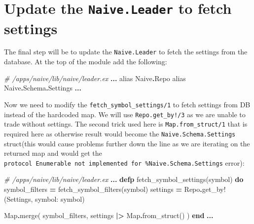 \documentclass[
  oneside]{book}
\newenvironment{Shaded}{\begin{snugshade}}{\end{snugshade}}
\newcommand{\CommentTok}[1]{\textcolor[rgb]{0.56,0.35,0.01}{\textit{#1}}}
\newcommand{\ConstantTok}[1]{\textcolor[rgb]{0.00,0.00,0.00}{#1}}
\newcommand{\ImportTok}[1]{#1}
\newcommand{\KeywordTok}[1]{\textcolor[rgb]{0.13,0.29,0.53}{\textbf{#1}}}
\newcommand{\NormalTok}[1]{#1}
\newcommand{\OperatorTok}[1]{\textcolor[rgb]{0.81,0.36,0.00}{\textbf{#1}}}
\newcommand{\VariableTok}[1]{\textcolor[rgb]{0.00,0.00,0.00}{#1}}
\begin{document}
\hypertarget{update-the-naive.leader-to-fetch-settings}{%
\section{\texorpdfstring{Update the \texttt{Naive.Leader} to fetch settings}{Update the Naive.Leader to fetch settings}}\label{update-the-naive.leader-to-fetch-settings}}

The final step will be to update the \texttt{Naive.Leader} to fetch the settings from the database. At the top of the module add the following:

\begin{Shaded}
\begin{Highlighting}[]
\CommentTok{\# /apps/naive/lib/naive/leader.ex}
  \OperatorTok{...}
  \ImportTok{alias} \ConstantTok{Naive}\OperatorTok{.}\ConstantTok{Repo}
  \ImportTok{alias} \ConstantTok{Naive}\OperatorTok{.}\ConstantTok{Schema}\OperatorTok{.}\ConstantTok{Settings}
  \OperatorTok{...}
\end{Highlighting}
\end{Shaded}

Now we need to modify the \texttt{fetch\_symbol\_settings/1} to fetch settings from DB instead of the hardcoded map. We will use \texttt{Repo.get\_by!/3} as we are unable to trade without settings. The second trick used here is \texttt{Map.from\_struct/1} that is required here as otherwise result would become the \texttt{Naive.Schema.Settings} struct(this would cause problems further down the line as we are iterating on the returned map and would get the \texttt{protocol\ Enumerable\ not\ implemented\ for\ \%Naive.Schema.Settings} error):

\begin{Shaded}
\begin{Highlighting}[]
\CommentTok{\# /apps/naive/lib/naive/leader.ex}
  \OperatorTok{...}
  \KeywordTok{defp}\NormalTok{ fetch\_symbol\_settings(symbol) }\KeywordTok{do}
\NormalTok{    symbol\_filters }\OperatorTok{=}\NormalTok{ fetch\_symbol\_filters(symbol)}
\NormalTok{    settings }\OperatorTok{=} \ConstantTok{Repo}\OperatorTok{.}\NormalTok{get\_by!(}\ConstantTok{Settings}\NormalTok{, }\VariableTok{symbol:}\NormalTok{ symbol)}

    \ConstantTok{Map}\OperatorTok{.}\NormalTok{merge(}
\NormalTok{      symbol\_filters,}
\NormalTok{      settings }\OperatorTok{|\textgreater{}} \ConstantTok{Map}\OperatorTok{.}\NormalTok{from\_struct()}
\NormalTok{    )}
  \KeywordTok{end}
  \OperatorTok{...}
\end{Highlighting}
\end{Shaded}
\end{document}
